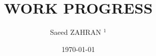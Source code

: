 \documentclass{beamer}
\title{WORK PROGRESS}
\author{Saeed ZAHRAN $^{1}$ }
\institute{$^{1}$UNIVERSITÉ DE PICARDIE JULES VERNE \\ 
		}
\date{\today}
\numberwithin{figure}{section}
\numberwithin{equation}{section}
\begin{document}

\begin{frame}[plain,t]
\titlepage
\end{frame}







\end{document}
